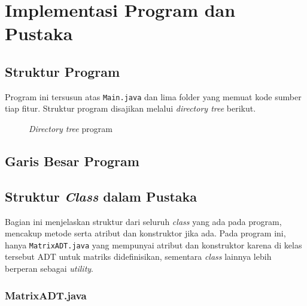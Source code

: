 \section{Implementasi Program dan Pustaka}
\subsection{Struktur Program}
Program ini tersusun atas \verb|Main.java| dan lima folder yang memuat kode sumber tiap fitur. Struktur program disajikan melalui \textit{directory tree} berikut.

\begin{figure}[htb!]
    \centering
    
    \begin{minipage}{7cm}
    \end{minipage}
    \caption{\textit{Directory tree} program}
    \label{fig:dirtree}
\end{figure}

\subsection{Garis Besar Program}

\pagebreak

\subsection{Struktur \textit{Class} dalam Pustaka}
Bagian ini menjelaskan struktur dari seluruh \textit{class} yang ada pada program, mencakup metode serta atribut dan konstruktor jika ada. Pada program ini, hanya \verb+MatrixADT.java+ yang mempunyai atribut dan konstruktor karena di kelas tersebut ADT untuk matriks didefinisikan, sementara \textit{class} lainnya lebih berperan sebagai \textit{utility}.

\subsubsection{MatrixADT.java}

